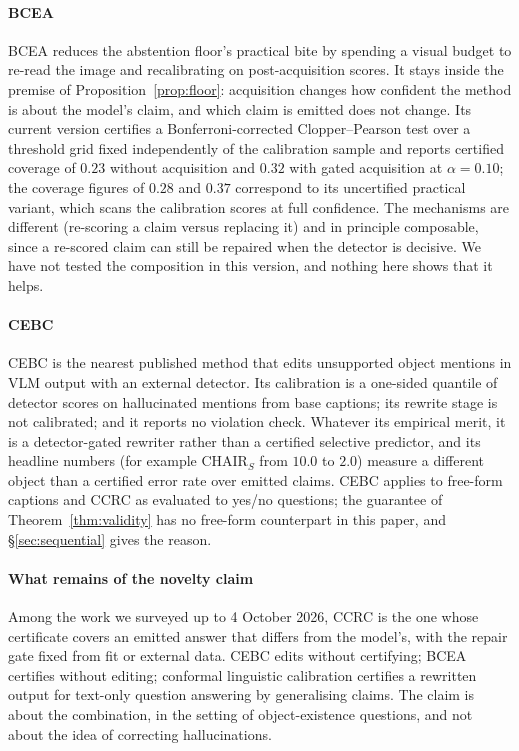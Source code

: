 \paragraph{BCEA}
BCEA reduces the abstention floor's practical bite by spending a visual budget to re-read the image and
recalibrating on post-acquisition scores. It stays inside the premise of Proposition~\ref{prop:floor}: acquisition changes how confident the
method is about the model's claim, and which claim is emitted does not change. Its current version certifies a
Bonferroni-corrected Clopper--Pearson test over a threshold grid fixed independently of the calibration sample and
reports certified coverage of $0.23$ without acquisition and $0.32$ with gated acquisition at $\alpha=0.10$; the
coverage figures of $0.28$ and $0.37$ correspond to its uncertified practical variant, which scans the calibration
scores at full confidence. The mechanisms are different (re-scoring a claim versus replacing it) and in principle
composable, since a re-scored claim can still be repaired when the detector is decisive. We have not tested
the composition in this version, and nothing here shows that it helps.

\paragraph{CEBC}
CEBC is the nearest published method that edits unsupported object mentions in VLM output with an external detector.
Its calibration is a one-sided quantile of detector scores on hallucinated mentions from base captions; its rewrite stage
is not calibrated; and it reports no violation check. Whatever its empirical merit, it is a detector-gated rewriter rather than a certified
selective predictor, and its headline numbers (for example CHAIR$_S$ from $10.0$ to $2.0$) measure a different object
than a certified error rate over emitted claims. CEBC applies to free-form captions and CCRC as evaluated to
yes/no questions; the guarantee of Theorem~\ref{thm:validity} has no free-form counterpart in this paper, and
\S\ref{sec:sequential} gives the reason.

\paragraph{What remains of the novelty claim}
Among the work we surveyed up to 4 October 2026, CCRC is the one whose certificate covers an emitted answer
that differs from the model's, with the repair gate fixed from fit or external data. CEBC edits without certifying;
BCEA certifies without editing; conformal linguistic calibration \citep{jiang2025clc} certifies a rewritten output
for text-only question answering by generalising claims. The claim is about the combination, in the setting of
object-existence questions, and not about the idea of correcting hallucinations.
